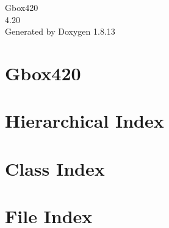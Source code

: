 \documentclass[twoside]{book}
\newcommand{\+}{\discretionary{\mbox{\scriptsize$\hookleftarrow$}}{}{}}
\newcommand{\clearemptydoublepage}{%
  \newpage{\pagestyle{empty}\cleardoublepage}%
}
\begin{document}
\hypersetup{pageanchor=false,
             bookmarksnumbered=true,
             pdfencoding=unicode
            }
\begin{titlepage}
\vspace*{7cm}
\begin{center}%
{\Large Gbox420 \\[1ex]\large 4.\+20 }\\
\vspace*{1cm}
{\large Generated by Doxygen 1.8.13}\\
\end{center}
\end{titlepage}
\clearemptydoublepage
{}
\tableofcontents
\clearemptydoublepage
{}
\hypersetup{pageanchor=true}

\chapter{Gbox420}
\label{md__home_bit__apps__gbox420__r_e_a_d_m_e}

\chapter{Hierarchical Index}

\chapter{Class Index}

\chapter{File Index}

\end{document}
